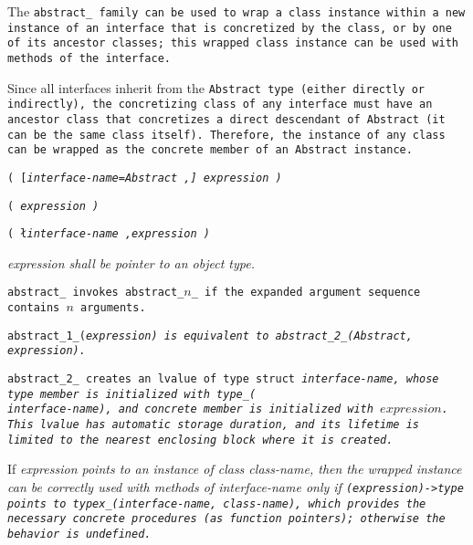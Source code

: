 The \tt{abstract_} family can be used to wrap a class
instance within a new instance of an interface that is
concretized by the class, or by one of its ancestor classes;
this wrapped class instance can be used with methods of the interface.

\note Since all interfaces inherit from the \tt{Abstract} type
(either directly or indirectly), the concretizing class of any
interface must have an ancestor class that concretizes a direct
descendant of \tt{Abstract} (it can be the same class itself).
Therefore, the instance of any class can be wrapped as
the \tt{concrete} member of an \tt{Abstract} instance.


\s\s\s\tt{(} [\it{interface-name}\tt{=Abstract} \tt{,}]
\it{expression} \tt{)}

\s\tt{(} \it{expression} \tt{)}

\s\tt{(} \l\it{interface-name} \tt{,}\r \it{expression} \tt{)}


\it{expression} shall be pointer to an object type.


\tt{abstract_} invokes \tt{abstract_}$n$\_ if the
expanded argument sequence contains  $n$ arguments.

\tt{abstract_1_(}\it{expression}\tt{)} is equivalent to
\tt{abstract_2_(Abstract,} \it{expression}\tt{)}.

\tt{abstract_2_} creates an lvalue of type \tt{struct} \it{interface-name},
whose \tt{type} member is initialized with \tt{type_(}\\\it{interface-name}\tt{)},
and \tt{concrete} member is initialized with $expression$.
This lvalue has automatic storage duration, and its lifetime
is limited to the nearest enclosing block where it is created.

\note If \it{expression} points to an instance of class \it{class-name},
then the wrapped instance can be correctly used with methods of
\it{interface-name} only if \tt{(}\it{expression}\tt{)->type} points to
\tt{typex_(}\it{interface-name}\tt{,} \it{class-name}\tt{)},
which provides the necessary concrete procedures (as function pointers);
otherwise the behavior is undefined.
